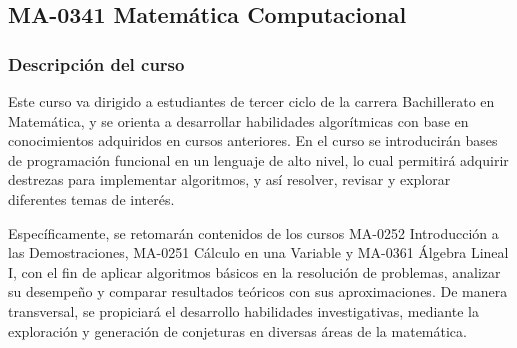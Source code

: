 \newpage
\subsection*{MA-0341 Matemática Computacional}

\hypertarget{MA0341}{}
\begin{refsection}
\begin{table}[H]
\end{table}

\subsubsection*{Descripción del curso}

Este curso va dirigido a estudiantes de tercer ciclo de la carrera Bachillerato en Matemática, y se orienta a desarrollar habilidades algorítmicas con base en conocimientos adquiridos en cursos anteriores. En el curso se introducirán bases de programación funcional en un lenguaje de alto nivel, lo cual permitirá adquirir destrezas para implementar algoritmos, y así resolver, revisar y explorar diferentes temas de interés.

Específicamente, se retomarán contenidos de los cursos MA-0252 Introducción a las Demostraciones, MA-0251 Cálculo en una Variable y MA-0361 Álgebra Lineal I, con el fin de aplicar algoritmos básicos en la resolución de problemas, analizar su desempeño y comparar resultados teóricos con sus aproximaciones. 
De manera transversal, se propiciará el desarrollo habilidades investigativas, mediante la exploración y generación de conjeturas en diversas áreas de la matemática.


\end{refsection}
